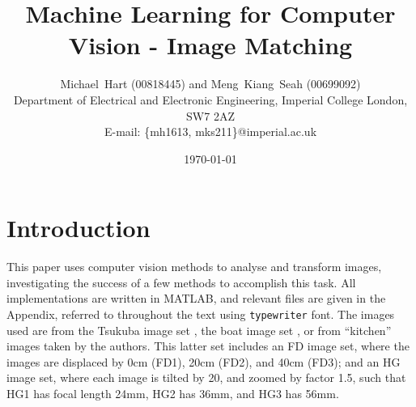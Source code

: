 \documentclass[a4paper, 10pt, conference]{ieeeconf}
\begin{document}
\title{Machine Learning for Computer Vision - Image Matching}
\author{Michael~Hart (00818445) and
        Meng~Kiang~Seah (00699092)
\\
        Department of Electrical and Electronic Engineering,
        Imperial College London,
        SW7 2AZ
\\
        E-mail: \{mh1613, mks211\}@imperial.ac.uk}
\date{\today}




\maketitle


%

\section{Introduction}

This paper uses computer vision methods to analyse and transform images, investigating the success of a few methods to accomplish this task. All implementations are written in MATLAB, and relevant files are given in the Appendix, referred to throughout the text using \texttt{typewriter} font. The images used are from the Tsukuba image set \cite{tsukuba}, the boat image set \cite{boat}, or from ``kitchen'' images taken by the authors. This latter set includes an FD image set, where the images are displaced by 0cm (FD1), 20cm (FD2), and 40cm (FD3); and an HG image set, where each image is tilted by 20\degree, and zoomed by factor 1.5, such that HG1 has focal length 24mm, HG2 has 36mm, and HG3 has 56mm.
\end{document}
